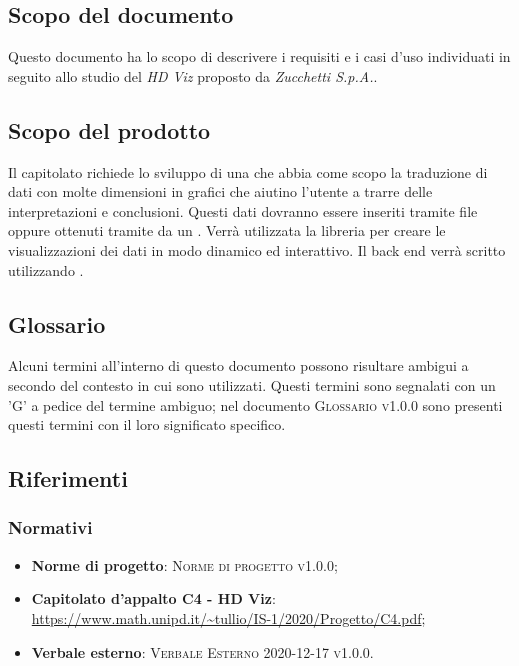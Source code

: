 \documentclass[../analisi-dei-requisiti.tex]{subfiles}
\begin{document}
\subsection{Scopo del documento}%
\label{subs:scopo_del_documento}
Questo documento ha lo scopo di descrivere i requisiti e i casi d'uso individuati in seguito allo studio del  \emph{HD Viz} proposto da \emph{Zucchetti S.p.A.}. 

\subsection{Scopo del prodotto}%
\label{subs:scopo_del_prodotto}
Il capitolato richiede lo sviluppo di una  che abbia come scopo la 
traduzione di dati con molte dimensioni in grafici che aiutino l’utente a trarre delle interpretazioni e conclusioni. Questi dati dovranno essere inseriti tramite file  oppure ottenuti tramite  da un .
Verrà utilizzata la libreria   per creare le visualizzazioni dei dati in modo dinamico ed interattivo.
Il back end verrà scritto utilizzando . 


\subsection{Glossario}
\label{subs:glossario}
Alcuni termini all'interno di questo documento possono risultare ambigui a secondo del contesto in cui sono utilizzati.
Questi termini sono segnalati con un 'G' a pedice del termine ambiguo; nel documento \textsc{Glossario v1.0.0} sono presenti questi termini con il loro significato specifico.


\subsection{Riferimenti}
\label{subs:riferimenti}

\subsubsection{Normativi}%
\label{sssec:normativi}

\begin{itemize}
  \item \textbf{Norme di progetto}: \textsc{Norme di progetto v1.0.0};
  \item \textbf{Capitolato d'appalto C4 - HD Viz}: \url{https://www.math.unipd.it/~tullio/IS-1/2020/Progetto/C4.pdf};
  \item \textbf{Verbale esterno}: \textsc{Verbale Esterno 2020-12-17 v1.0.0}.
\end{itemize}
\end{document}
